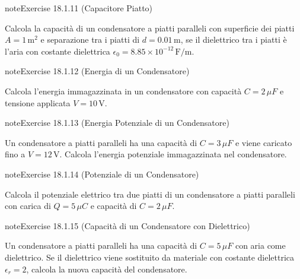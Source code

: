 \documentclass[letterpaper,10pt,italian]{jupyterBook}
\begin{document}
\begin{sphinxadmonition}{note}{Exercise 18.1.11 (Capacitore Piatto)}



\sphinxAtStartPar
Calcola la capacità di un condensatore a piatti paralleli con superficie dei piatti \(A = 1 \, \text{m}^2\) e separazione tra i piatti di \(d = 0.01 \, \text{m}\), se il dielettrico tra i piatti è l’aria con costante dielettrica \(\epsilon_0 = 8.85 \times 10^{-12} \, \text{F/m}\).
\end{sphinxadmonition}
 \label{exercise:ch/electromagnetism/electrostatics-problems-exercise-11}

\begin{sphinxadmonition}{note}{Exercise 18.1.12 (Energia di un Condensatore)}



\sphinxAtStartPar
Calcola l’energia immagazzinata in un condensatore con capacità \(C = 2 \, \mu F\) e tensione applicata \(V = 10 \, \text{V}\).
\end{sphinxadmonition}
 \label{exercise:ch/electromagnetism/electrostatics-problems-exercise-12}

\begin{sphinxadmonition}{note}{Exercise 18.1.13 (Energia Potenziale di un Condensatore)}



\sphinxAtStartPar
Un condensatore a piatti paralleli ha una capacità di \(C = 3 \, \mu F\) e viene caricato fino a \(V = 12 \, \text{V}\). Calcola l’energia potenziale immagazzinata nel condensatore.
\end{sphinxadmonition}
 \label{exercise:ch/electromagnetism/electrostatics-problems-exercise-13}

\begin{sphinxadmonition}{note}{Exercise 18.1.14 (Potenziale di un Condensatore)}



\sphinxAtStartPar
Calcola il potenziale elettrico tra due piatti di un condensatore a piatti paralleli con carica di \(Q = 5 \, \mu C\) e capacità di \(C = 2 \, \mu F\).
\end{sphinxadmonition}
 \label{exercise:ch/electromagnetism/electrostatics-problems-exercise-14}

\begin{sphinxadmonition}{note}{Exercise 18.1.15 (Capacità di un Condensatore con Dielettrico)}



\sphinxAtStartPar
Un condensatore a piatti paralleli ha una capacità di \(C = 5 \, \mu F\) con aria come dielettrico. Se il dielettrico viene sostituito da materiale con costante dielettrica \(\epsilon_r = 2\), calcola la nuova capacità del condensatore.
\end{sphinxadmonition}
 \label{exercise:ch/electromagnetism/electrostatics-problems-exercise-15}
\end{document}
